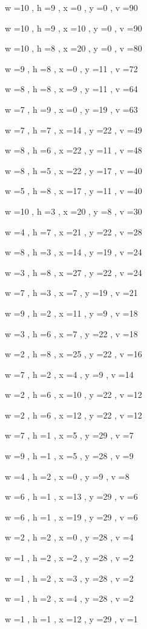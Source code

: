 \documentclass[11pt]{article}
\begin{document}
w =10 , h =9 , x =0 , y =0 , v =90
\par
w =10 , h =9 , x =10 , y =0 , v =90
\par
w =10 , h =8 , x =20 , y =0 , v =80
\par
w =9 , h =8 , x =0 , y =11 , v =72
\par
w =8 , h =8 , x =9 , y =11 , v =64
\par
w =7 , h =9 , x =0 , y =19 , v =63
\par
w =7 , h =7 , x =14 , y =22 , v =49
\par
w =8 , h =6 , x =22 , y =11 , v =48
\par
w =8 , h =5 , x =22 , y =17 , v =40
\par
w =5 , h =8 , x =17 , y =11 , v =40
\par
w =10 , h =3 , x =20 , y =8 , v =30
\par
w =4 , h =7 , x =21 , y =22 , v =28
\par
w =8 , h =3 , x =14 , y =19 , v =24
\par
w =3 , h =8 , x =27 , y =22 , v =24
\par
w =7 , h =3 , x =7 , y =19 , v =21
\par
w =9 , h =2 , x =11 , y =9 , v =18
\par
w =3 , h =6 , x =7 , y =22 , v =18
\par
w =2 , h =8 , x =25 , y =22 , v =16
\par
w =7 , h =2 , x =4 , y =9 , v =14
\par
w =2 , h =6 , x =10 , y =22 , v =12
\par
w =2 , h =6 , x =12 , y =22 , v =12
\par
w =7 , h =1 , x =5 , y =29 , v =7
\par
w =9 , h =1 , x =5 , y =28 , v =9
\par
w =4 , h =2 , x =0 , y =9 , v =8
\par
w =6 , h =1 , x =13 , y =29 , v =6
\par
w =6 , h =1 , x =19 , y =29 , v =6
\par
w =2 , h =2 , x =0 , y =28 , v =4
\par
w =1 , h =2 , x =2 , y =28 , v =2
\par
w =1 , h =2 , x =3 , y =28 , v =2
\par
w =1 , h =2 , x =4 , y =28 , v =2
\par
w =1 , h =1 , x =12 , y =29 , v =1
\par
\newpage
\end{document}
